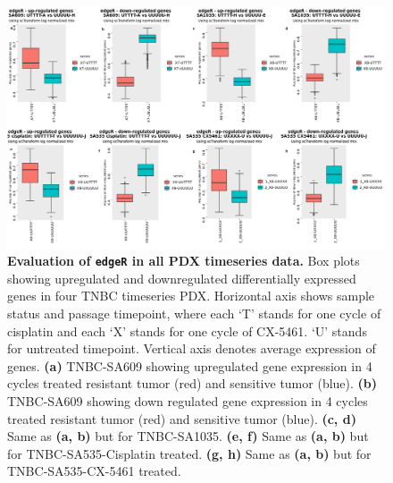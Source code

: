 \begin{figure}
\centering
\includegraphics[width=\textwidth]{Figures/chap5/edgeRevaluation3series.png}
	
\caption[Evaluation of \texttt{edgeR} in all PDX timeseries data.]
	{\small
	\textbf{Evaluation of \texttt{edgeR} in all PDX timeseries data.}
	Box plots showing upregulated and downregulated differentially expressed genes in four TNBC timeseries PDX. Horizontal axis shows sample status and passage timepoint, where each `T' stands for one cycle of cisplatin and each `X' stands for one cycle of CX-5461. `U' stands for untreated timepoint. Vertical axis denotes average expression of genes.
	\textbf{(a)} TNBC-SA609 showing upregulated gene expression in 4 cycles treated resistant tumor (red) and sensitive tumor (blue). 
	\textbf{(b)} TNBC-SA609 showing down regulated gene expression in 4 cycles treated resistant tumor (red) and sensitive tumor (blue). 
		\textbf{(c, d)} Same as \textbf{(a, b)} but for TNBC-SA1035.
		\textbf{(e, f)} Same as \textbf{(a, b)} but for TNBC-SA535-Cisplatin treated.
		\textbf{(g, h)} Same as \textbf{(a, b)} but for TNBC-SA535-CX-5461 treated.
	}
	\label{fig:edgeRevaluation3series}
\end{figure}




